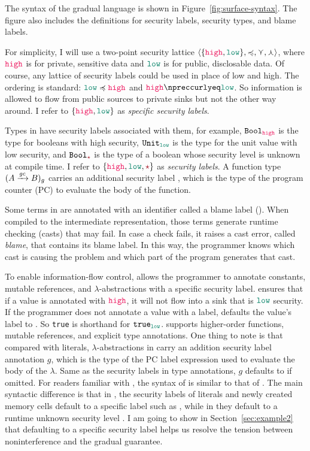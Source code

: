 The syntax of the gradual language \Surface is shown in
Figure~\ref{fig:surface-syntax}. The figure also includes the definitions for
security labels, security types, and blame labels.

For simplicity, I will use a two-point security lattice $\langle \{\high, \low\}
, \preccurlyeq, \curlyvee , \curlywedge \rangle$, where $\high$ is for private,
sensitive data and $\low$ is for public, disclosable data. Of course, any
lattice of security labels could be used in place of low and high. The ordering
is standard: $\low \preccurlyeq \high$ and $\high \npreccurlyeq \low$. So
information is allowed to flow from public sources to private sinks but not the
other way around. I refer to $\{\high,\low\}$ as \emph{specific security
labels}.

Types in \Surface have security labels associated with them, for example,
$\Bool_{\high}$ is the type for booleans with high security, $\Unit_{\low}$ is
the type for the unit value with low security, and $\Bool_{\unk}$ is the type of
a boolean whose security level is unknown at compile time. I refer to
$\{\high,\low,\unk\}$ as \emph{security labels}. A function type
$({A}\xrightarrow{{\mathit{gc}}}{B})_g$ carries an additional security label \gc, which is the
type of the program counter (PC) to evaluate the body of the function.

Some terms in \Surface are annotated with an identifier called a blame label
(). When compiled to the intermediate representation, those terms generate
runtime checking (casts) that may fail. In case a check fails, it raises a cast
error, called \textit{blame}, that contains its blame label. In this way, the
programmer knows which cast is causing the problem and which part of the program
generates that cast.

To enable information-flow control, \Surface allows the programmer to annotate
constants, mutable references, and $\lambda$-abstractions with a specific
security label. \Surface ensures that if a value is annotated with $\high$, it
will not flow into a sink that is $\low$ security. If the programmer does not
annotate a value with a label, \Surface defaults the value's label to \low. So
\texttt{true} is shorthand for $\mathtt{true}_{\low}$. \Surface supports
higher-order functions, mutable references, and explicit type annotations. One
thing to note is that compared with literals, $\lambda$-abstractions in \Surface
carry an addition security label annotation $g$, which is the type of the PC
label expression used to evaluate the body of the $\lambda$. Same as the
security labels in type annotations, $g$ defaults to \unk if omitted. For
readers familiar with \GSLRef, the syntax of \Surface is similar to that of
\GSLRef. The main syntactic difference is that in \Surface, the security labels
of literals and newly created memory cells default to a specific label such as
\low, while in \GSLRef they default to a runtime unknown security level \unk. I
am going to show in Section~\ref{sec:example2} that defaulting to a specific
security label helps us resolve the tension between noninterference and the
gradual guarantee.

